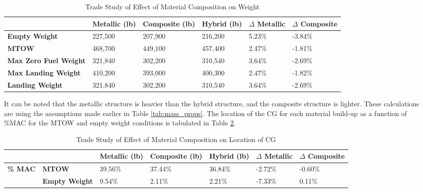 \begin{table}[!h]
\centering
\caption{Trade Study of Effect of Material Composition on Weight}
\label{tab:mass_study}
\begin{tabular}{|l||l|l|l|l|l|}
\hline
                              & \textbf{Metallic (lb)} & \textbf{Composite (lb)} & \textbf{Hybrid (lb)} & \textbf{$\Delta$ Metallic} & \textbf{$\Delta$ Composite} \\ \hline \hline
\textbf{Empty Weight}         & 227,500                & 207,900                 & 216,200              & 5.23\%                  & -3.84\%                  \\ \hline
\textbf{MTOW}                 & 468,700                & 449,100                 & 457,400              & 2.47\%                  & -1.81\%                  \\ \hline
\textbf{Max Zero Fuel Weight} & 321,840                & 302,200                 & 310,540              & 3.64\%                  & -2.69\%                  \\ \hline
\textbf{Max Landing Weight}   & 410,200                & 393,000                 & 400,300              & 2.47\%                  & -1.82\%                  \\ \hline
\textbf{Landing Weight}       & 321,840                & 302,200                 & 310,540              & 3.64\%                  & -2.69\%                  \\ \bottomrule
\end{tabular}
\end{table}

It can be noted that the metallic structure is heavier than the hybrid structure, and the composite structure is lighter. These calculations are using the assumptions made earlier in Table \ref{tab:mass_props}. The location of the CG for each material build-up as a function of \%MAC for the MTOW and empty weight conditions is tabulated in Table \ref{tab:mass_study2}.

\begin{table}[!h]
\centering
\caption{Trade Study of Effect of Material Composition on Location of CG}
\label{tab:mass_study2}
\begin{tabular}{|c|l||l|l|l|l|l|}
\hline
\multicolumn{2}{|l||}{}                                   & \textbf{Metallic   (lb)} & \textbf{Composite (lb)} & \textbf{Hybrid (lb)} & \textbf{$\Delta$ Metallic} & \textbf{$\Delta$ Composite} \\ \hline \hline
\multirow{2}{*}{\textbf{\% MAC}} & \textbf{MTOW}         & 39.56\%                  & 37.44\%                 & 36.84\%              & -2.72\%                 & -0.60\%                  \\ \cline{2-7} 
                                 & \textbf{Empty Weight} & 9.54\%                   & 2.11\%                  & 2.21\%               & -7.33\%                 & 0.11\%                   \\ \bottomrule
\end{tabular}
\end{table}

